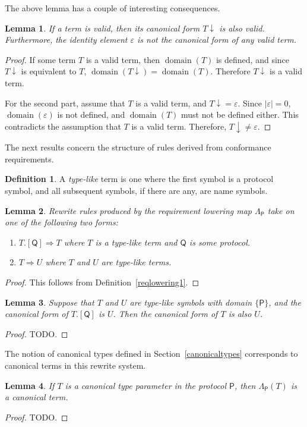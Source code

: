 \documentclass[headsepline,bibliography=totoc]{scrreport}
\newcommand{\proto}[1]{\bm{\mathsf{#1}}}
\newcommand{\protosym}[1]{[\proto{#1}]}
\DeclareMathOperator{\domain}{domain}
\newtheorem{lemma}{Lemma}[chapter]
\theoremstyle{definition}
\theoremstyle{definition}
\newtheorem{definition}{Definition}[chapter]
\theoremstyle{definition}
\begin{document}
The above lemma has a couple of interesting consequences.
\begin{lemma} If a term is valid, then its canonical form ${T}{\downarrow}$ is also valid. Furthermore, the identity element $\varepsilon$ is not the canonical form of any valid term.
\end{lemma}
\begin{proof} If some term $T$ is a valid term, then $\domain(T)$ is defined, and since ${T}{\downarrow}$ is equivalent to $T$, $\domain({T}{\downarrow})=\domain(T)$. Therefore ${T}{\downarrow}$ is a valid term.

For the second part, assume that $T$ is a valid term, and ${T}{\downarrow}=\varepsilon$. Since $|\varepsilon|=0$, $\domain(\varepsilon)$ is not defined, and $\domain(T)$ must not be defined either. This contradicts the assumption that $T$ is a valid term. Therefore, ${T}{\downarrow}\neq\varepsilon$.
\end{proof}

The next results concern the structure of rules derived from conformance requirements.
\begin{definition} A \emph{type-like} term is one where the first symbol is a protocol symbol, and all subsequent symbols, if there are any, are name symbols.
\end{definition}
\begin{lemma} Rewrite rules produced by the requirement lowering map $\Lambda_{\proto{P}}$ take on one of the following two forms:
\begin{enumerate}
\item $T.\protosym{Q}\Rightarrow T$ where $T$ is a type-like term and $\proto{Q}$ is some protocol.
\item $T\Rightarrow U$ where $T$ and $U$ are type-like terms.
\end{enumerate}
\end{lemma}
\begin{proof} This follows from Definition~\ref{reqlowering1}.
\end{proof}

\begin{lemma}\label{propliketerm1} Suppose that $T$ and $U$ are type-like symbols with domain $\{\proto{P}\}$, and the canonical form of $T.\protosym{Q}$ is $U$. Then the canonical form of $T$ is also $U$.
\end{lemma}
\begin{proof}
TODO.
\end{proof}

The notion of canonical types defined in Section~\ref{canonicaltypes} corresponds to canonical terms in this rewrite system.
\begin{lemma} If $T$ is a canonical type parameter in the protocol $\proto{P}$, then $\Lambda_{\proto{P}}(T)$ is a canonical term.
\end{lemma}
\begin{proof}
TODO.
\end{proof}
\end{document}
